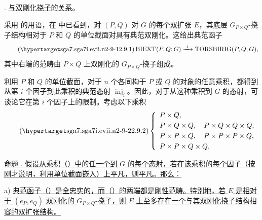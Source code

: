 

. \underline{与双刚化挠子的关系}。

采用  的用语，在  中已看到，对 $(P,Q)$ 对 $G$ 的每个双扩张 $E$，其底层 $G_{P\times Q}$-挠子结构相对于 $P$ 和 $Q$ 的单位截面对具有典范双刚化。这给出典范函子
\begin{equation}\tag{\SGARefTarget{sga7.sga7i.evii.n2-9-1}{2.9.1}}
 \operatorname{BIEXT}(P,Q;G)
 \xrightarrow{\ i\ }
 \operatorname{TORSBIRIG}(P,Q;G),
\end{equation}
其中右端的范畴由 $P\times Q$ 上双刚化的 $G_{P\times Q}$-挠子组成。

利用 $P$ 和 $Q$ 的单位截面，对于 $n$ 个各同构于 $P$ 或 $Q$ 的对象的任意乘积，都得到从第 $i$ 个因子到此乘积的典范态射 $\operatorname{inj}_i$。因此，对于从这种乘积到 $G$ 的态射，可谈论它在第 $i$ 个因子上的限制。考虑以下乘积
\begin{equation}\tag{\SGARefTarget{sga7.sga7i.evii.n2-9-2}{2.9.2}}
 \left\{
 \begin{array}{l}
 P\times Q,\\[1mm]
 P\times Q\times Q,\quad P\times Q\times Q\times Q,\\[1mm]
 P\times P\times Q,\quad P\times P\times P\times Q,\\[1mm]
 P\times P\times Q\times Q.
 \end{array}
 \right.
\end{equation}


\underline{命题 . 假设从乘积（）中的任一个到 $G$ 的每个态射，若在该乘积的每个因子（按刚才说明，利用单位截面嵌入）上平凡，则平凡。那么：}

\medskip
\noindent
a) \underline{典范函子（）是全忠实的，而（）的两端都是刚性范畴。特别地，若 $E$ 是相对于 $(e_P,e_Q)$ 双刚化的 $G_{P\times Q}$-挠子，则 $E$ 上至多存在一个与其双刚化挠子结构相容的双扩张结构。}

